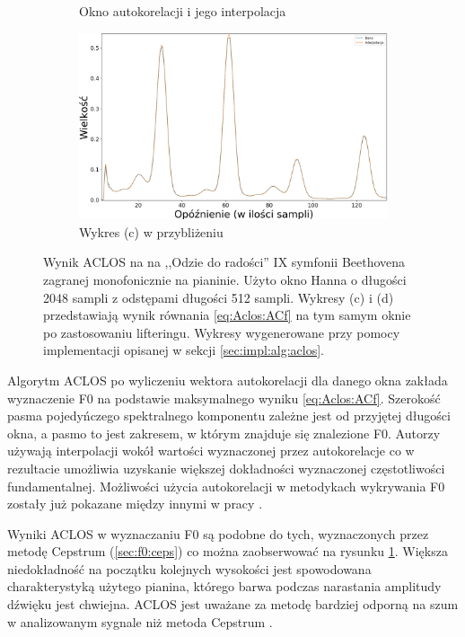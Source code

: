 \documentclass[12pt,a4paper,twoside]{mwart}
\begin{document}
\begin{figure}[ht]
\begin{subfigure}{0.5\textwidth}
    \caption{Okno autokorelacji i jego interpolacja}
  \end{subfigure}
  \begin{subfigure}{0.49\textwidth}
    \centering
    \includegraphics[width=1.\linewidth]{images/ACLOS/Interpolacja_superzoomed_cropped.png}
    \caption{Wykres (c) w przybliżeniu}
  \end{subfigure}
  \caption{Wynik ACLOS na na ,,Odzie do radości'' IX symfonii Beethovena zagranej monofonicznie na pianinie. Użyto okno Hanna o długości 2048 sampli z odstępami długości 512 sampli. Wykresy (c) i (d) przedstawiają wynik równania \ref{eq:Aclos:ACf} na tym samym oknie po zastosowaniu lifteringu. Wykresy wygenerowane przy pomocy implementacji opisanej w sekcji \ref{sec:impl:alg:aclos}.}
  \label{fig:aclos:results}
\end{figure}

Algorytm ACLOS po wyliczeniu wektora autokorelacji dla danego okna zakłada wyznaczenie F0 na podstawie maksymalnego wyniku \ref{eq:Aclos:ACf}. Szerokość pasma pojedyńczego spektralnego komponentu zależne jest od przyjętej długości okna, a pasmo to jest zakresem, w którym znajduje się znalezione F0. Autorzy używają interpolacji wokół wartości wyznaczonej przez autokorelacje co w rezultacie umożliwia uzyskanie większej dokładności wyznaczonej częstotliwości fundamentalnej. Możliwości użycia autokorelacji w metodykach wykrywania F0 zostały już pokazane między innymi w pracy \cite[1046-1047]{Transcription:Suzuki:EstimationOfMistunedFrequency}.


Wyniki ACLOS w wyznaczaniu F0 są podobne do tych, wyznaczonych przez metodę Cepstrum (\ref{sec:f0:ceps}) co można zaobserwować na rysunku \ref{fig:aclos:results}. Większa niedokładność na początku kolejnych wysokości jest spowodowana charakterystyką użytego pianina, którego barwa podczas narastania amplitudy dźwięku jest chwiejna. ACLOS jest uważane za metodę bardziej odporną na szum w analizowanym sygnale niż metoda Cepstrum \cite{Transcription:Kunieda:Aclos}.
\end{document}
